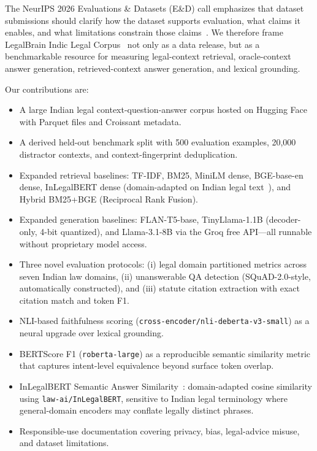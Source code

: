 \documentclass{article}
\begin{document}
The NeurIPS 2026 Evaluations \& Datasets (E\&D) call emphasizes that dataset submissions should clarify how the dataset supports evaluation, what claims it enables, and what limitations constrain those claims~\citep{neurips2026edcfp,neurips2026edblog}. We therefore frame LegalBrain Indic Legal Corpus~\citep{legalbrainhf} not only as a data release, but as a benchmarkable resource for measuring legal-context retrieval, oracle-context answer generation, retrieved-context answer generation, and lexical grounding.

Our contributions are:
\begin{itemize}
    \item A large Indian legal context-question-answer corpus hosted on Hugging Face with Parquet files and Croissant metadata.
    \item A derived held-out benchmark split with 500 evaluation examples, 20,000 distractor contexts, and context-fingerprint deduplication.
    \item Expanded retrieval baselines: TF-IDF, BM25, MiniLM dense, BGE-base-en dense, InLegalBERT dense (domain-adapted on Indian legal text~\citep{inlegalner}), and Hybrid BM25+BGE (Reciprocal Rank Fusion).
    \item Expanded generation baselines: FLAN-T5-base, TinyLlama-1.1B (decoder-only, 4-bit quantized), and Llama-3.1-8B via the Groq free API---all runnable without proprietary model access.
    \item Three novel evaluation protocols: (i) legal domain partitioned metrics across seven Indian law domains, (ii) unanswerable QA detection (SQuAD-2.0-style, automatically constructed), and (iii) statute citation extraction with exact citation match and token F1.
    \item NLI-based faithfulness scoring (\texttt{cross-encoder/nli-deberta-v3-small}) as a neural upgrade over lexical grounding.
    \item BERTScore F1 (\texttt{roberta-large}) as a reproducible semantic similarity metric that captures intent-level equivalence beyond surface token overlap.
    \item InLegalBERT Semantic Answer Similarity~\citep{risch2021sas,paul2023pretraining}: domain-adapted cosine similarity using \texttt{law-ai/InLegalBERT}, sensitive to Indian legal terminology where general-domain encoders may conflate legally distinct phrases.
    \item Responsible-use documentation covering privacy, bias, legal-advice misuse, and dataset limitations.
\end{itemize}
\end{document}
